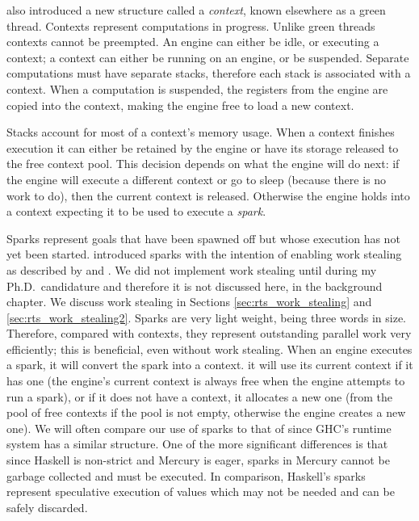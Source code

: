 \citet{conway:2002:par} also introduced a new structure called a
\emph{context}, known elsewhere as a green thread.
Contexts represent computations in progress.
Unlike green threads contexts cannot be preempted.
An engine can either be idle, or executing a context;
a context can either be running on an engine, or be suspended.
Separate computations must have separate stacks,
therefore each stack is associated with a context.
When a computation is suspended,
the registers from the engine are copied into the context,
making the engine free to load a new context.

Stacks account for most of a context's memory usage.
When a context finishes execution
it can either be retained by the engine or
have its storage released to the free context pool.
This decision depends on what the engine will do next:
if the engine will execute a different context or go to sleep
(because there is no work to do),
then the current context is released.
Otherwise the engine holds into a context expecting it to be used to execute
a \emph{spark}.

Sparks represent goals that have been spawned off
but whose execution has not yet been started.
\citet{wang:2006:hons} introduced sparks with the intention of
enabling work stealing as described by
\citet{blumofe:1994:work-stealing,halstead:1985:multilisp}
and \citet{kranz:1989:mul-t_article}.
We did not implement work stealing until during my Ph.D.\ candidature
and therefore it is not discussed here, in the background chapter.
We discuss work stealing in Sections \ref{sec:rts_work_stealing}
and \ref{sec:rts_work_stealing2}.
Sparks are very light weight,
being three words in size.
Therefore, compared with contexts,
they represent outstanding parallel work very efficiently;
this is beneficial, even without work stealing.
When an engine executes a spark, it will convert the spark into a context.
it will use its current context if it has one
(the engine's current context is always free when the engine attempts to run
a spark),
or if it does not have a context,
it allocates a new one
(from the pool of free contexts if the pool is not empty,
otherwise the engine creates a new one).
We will often compare our use of sparks to that of
\citet{simonmar_2009_multicore_rts} since GHC's runtime system has a
similar structure.
One of the more significant differences
is that since Haskell is non-strict and Mercury is eager,
sparks in Mercury cannot be garbage collected and must be executed.
In comparison,
Haskell's sparks represent speculative execution of values which may not be
needed and can be safely discarded.

